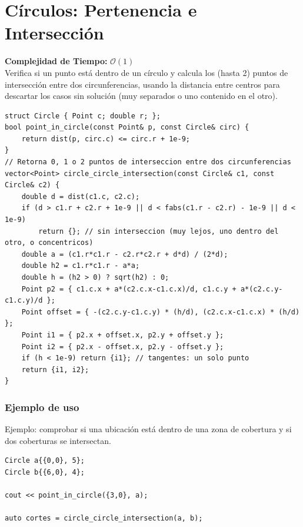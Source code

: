 \documentclass[10pt,twocolumn,letterpaper]{report}
\begin{document}
\section{Círculos: Pertenencia e Intersección}
\textbf{Complejidad de Tiempo:} $\mathcal{O}(1)$ \\
Verifica si un punto está dentro de un círculo y calcula los (hasta 2) puntos de intersección entre dos circunferencias, usando la distancia entre centros para descartar los casos sin solución (muy separados o uno contenido en el otro).
\begin{lstlisting}
struct Circle { Point c; double r; };
bool point_in_circle(const Point& p, const Circle& circ) {
    return dist(p, circ.c) <= circ.r + 1e-9;
}
// Retorna 0, 1 o 2 puntos de interseccion entre dos circunferencias
vector<Point> circle_circle_intersection(const Circle& c1, const Circle& c2) {
    double d = dist(c1.c, c2.c);
    if (d > c1.r + c2.r + 1e-9 || d < fabs(c1.r - c2.r) - 1e-9 || d < 1e-9)
        return {}; // sin interseccion (muy lejos, uno dentro del otro, o concentricos)
    double a = (c1.r*c1.r - c2.r*c2.r + d*d) / (2*d);
    double h2 = c1.r*c1.r - a*a;
    double h = (h2 > 0) ? sqrt(h2) : 0;
    Point p2 = { c1.c.x + a*(c2.c.x-c1.c.x)/d, c1.c.y + a*(c2.c.y-c1.c.y)/d };
    Point offset = { -(c2.c.y-c1.c.y) * (h/d), (c2.c.x-c1.c.x) * (h/d) };
    Point i1 = { p2.x + offset.x, p2.y + offset.y };
    Point i2 = { p2.x - offset.x, p2.y - offset.y };
    if (h < 1e-9) return {i1}; // tangentes: un solo punto
    return {i1, i2};
}
\end{lstlisting}
\subsubsection*{Ejemplo de uso}
Ejemplo: comprobar si una ubicación está dentro de una zona de cobertura y si dos coberturas se intersectan.
\begin{lstlisting}
Circle a{{0,0}, 5};
Circle b{{6,0}, 4};

cout << point_in_circle({3,0}, a);

auto cortes = circle_circle_intersection(a, b);
\end{lstlisting}
\end{document}
